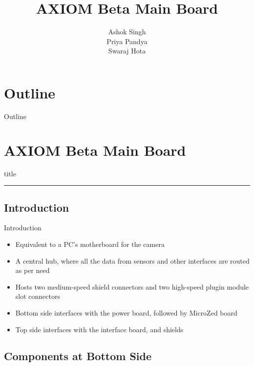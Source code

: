 \documentclass{beamer}
\title{AXIOM Beta Main Board}
\author{Ashok Singh \\ Priya Pandya \\ Swaraj Hota}
\date
\begin{document}
{
    \frame{\titlepage}
}

\section*{Outline}

\begin{frame}{Outline}
    \tableofcontents
\end{frame}

\section{AXIOM Beta Main Board}

\begin{frame}[plain]
    \begin{beamercolorbox}[sep=8pt,center,shadow=true,rounded=true]{title}
        \insertsectionhead\par
        \color{apertus_orange}\noindent\rule{10cm}{1pt}
    \end{beamercolorbox}
\end{frame}

\subsection{Introduction}

\begin{frame}{Introduction}
    \begin{itemize}
    \item Equivalent to a PC's motherboard for the camera
    \item A central hub, where all the data from sensors and other interfaces 
        are routed as per need
    \item Hosts two medium-speed shield connectors and two high-speed plugin module
        slot connectors
    \item Bottom side interfaces with the power board, followed by MicroZed board
    \item Top side interfaces with the interface board, and shields
    \end{itemize}
\end{frame}

\subsection{Components at Bottom Side}
\end{document}
